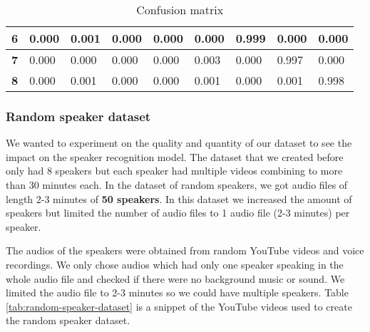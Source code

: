 \documentclass[10pt,twocolumn,letterpaper]{article}
\begin{document}
\begin{table}[h]
\begin{tabular}{l|l|l|l|l|l|l|l|l|}
    \multicolumn{1}{|l|}{\textbf{6}} & 0.000                         & 0.001                         & 0.000                         & 0.000                         & 0.000                         & \cellcolor[HTML]{67FD9A}0.999 & 0.000                         & 0.000                         \\ \hline
    \multicolumn{1}{|l|}{\textbf{7}} & 0.000                         & 0.000                         & 0.000                         & 0.000                         & 0.003                         & 0.000                         & \cellcolor[HTML]{67FD9A}0.997 & 0.000                         \\ \hline
    \multicolumn{1}{|l|}{\textbf{8}} & 0.000                         & 0.001                         & 0.000                         & 0.000                         & 0.001                         & 0.000                         & 0.001                         & \cellcolor[HTML]{67FD9A}0.998 \\ \hline
    \end{tabular}
    \caption{Confusion matrix}
    \label{Confusion matrix}
\end{table}

\subsubsection{Random speaker dataset}

We wanted to experiment on the quality and quantity of our dataset to see the impact on the speaker recognition model. The dataset that we created before only had 8 speakers but each speaker had multiple videos combining to more than 30 minutes each. In the dataset of random speakers, we got audio files of length 2-3 minutes of \textbf{50 speakers}. In this dataset we increased the amount of speakers but limited the number of audio files to 1 audio file (2-3 minutes) per speaker. 

The audios of the speakers were obtained from random YouTube videos and voice recordings. We only chose audios which had only one speaker speaking in the whole audio file and checked if there were no background music or sound. We limited the audio file to 2-3 minutes so we could have multiple speakers. Table \ref{tab:random-speaker-dataset} is a snippet of the YouTube videos used to create the random speaker dataset.
\end{document}
